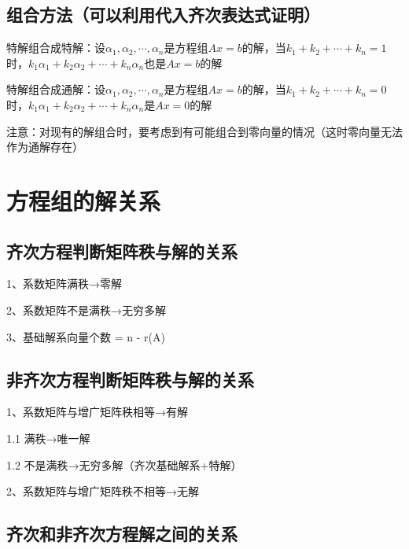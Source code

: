 \subsection{组合方法（可以利用代入齐次表达式证明）}

特解组合成特解：设$\alpha_1,\alpha_2,\cdots,\alpha_n$是方程组$Ax=b$的解，当$k_1+k_2+\cdots+k_n=1$时，$k_1\alpha_1+k_2\alpha_2+\cdots+k_n\alpha_n $也是$Ax=b$的解

特解组合成通解：设$\alpha_1,\alpha_2,\cdots,\alpha_n$是方程组$Ax=b$的解，当$k_1+k_2+\cdots+k_n=0$时，$k_1\alpha_1+k_2\alpha_2+\cdots+k_n\alpha_n $是$Ax=0$的解

注意：对现有的解组合时，要考虑到有可能组合到零向量的情况（这时零向量无法作为通解存在）

\section{方程组的解关系}



\subsection{齐次方程判断矩阵秩与解的关系}

1、系数矩阵满秩→零解

2、系数矩阵不是满秩→无穷多解

3、基础解系向量个数 = n - r(A)



\subsection{非齐次方程判断矩阵秩与解的关系}

1、系数矩阵与增广矩阵秩相等→有解

1.1 满秩→唯一解

1.2 不是满秩→无穷多解（齐次基础解系+特解）

2、系数矩阵与增广矩阵秩不相等→无解



\subsection{齐次和非齐次方程解之间的关系}

